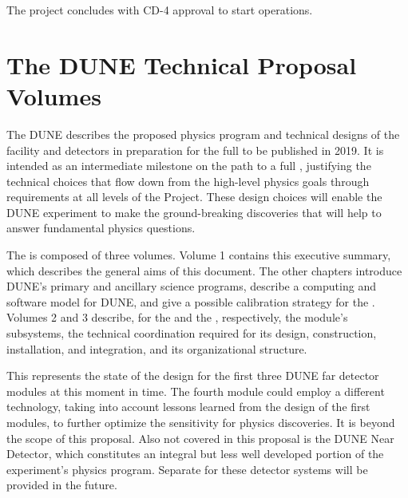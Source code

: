 The project concludes with CD-4 approval to start operations.


\section{The DUNE Technical Proposal Volumes}


The DUNE  describes the proposed physics program and 
technical designs of the facility and detectors in preparation for the full  
to be published in 2019.  
It is intended as an intermediate
milestone on the path to a full , justifying the technical choices that flow down from the high-level physics goals through requirements at all levels of the Project. These design choices will enable the DUNE experiment to make the ground-breaking discoveries that will help to  answer %
fundamental physics questions.

The   is composed of three volumes. Volume 1 contains this executive summary, which describes 
the general aims of this document. The other chapters introduce DUNE's primary and ancillary science programs, describe a computing and software model for DUNE, and give a possible calibration strategy for the \lar {}. 
Volumes 2  and 3 describe, for the  and the , respectively, the module's subsystems, the technical coordination required for its design, construction, installation, and integration, and its organizational structure.


This   represents the state of the design for the first three DUNE far detector modules at this moment
in time. The fourth module could employ a different \lartpc technology, taking into account lessons learned from the design of the first modules,  to further optimize the sensitivity for physics discoveries. It is beyond the scope of this proposal. Also not covered in this proposal is the DUNE Near Detector, which constitutes an integral but less well developed portion of the experiment's  physics program. Separate   for these detector systems will be
provided in the future.

